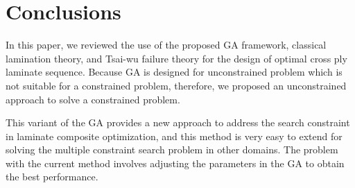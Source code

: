 \section{Conclusions}
In this paper, we reviewed the use of the proposed GA framework, classical lamination
theory, and Tsai-wu failure theory for the design of optimal cross ply laminate
sequence. Because GA is designed for unconstrained  problem which is not
suitable for a constrained problem, therefore, we proposed an unconstrained
approach to solve a constrained problem.

This variant of the GA provides a new approach to address the search constraint in laminate composite
optimization, and this method is very easy to extend for solving the multiple constraint search problem in other
domains. The problem with the current method involves adjusting the parameters in the GA to obtain the best
performance.
